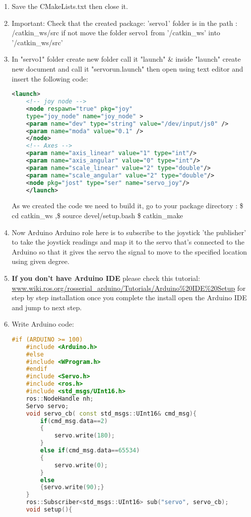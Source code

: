 \begin{enumerate}
 	\item Save the CMakeLists.txt then close it.
 	\item Important: Check that the created package: 'servo1' folder is in the path : /catkin\_ws/src
 	if not move the folder servo1 from '/catkin\_ws' into '/catkin\_ws/src'
 	\item In "servo1" folder create new folder call it "launch" \& inside "launch" create new document and call it "servorun.launch" then open using text editor and insert the following code:\\
 	\begin{lstlisting}[language=XML]
 	<launch>
 	<!-- joy node -->
 	<node respawn="true" pkg="joy"
 	type="joy_node" name="joy_node" >
 	<param name="dev" type="string" value="/dev/input/js0" />
 	<param name="moda" value="0.1" />
 	</node>
 	<!-- Axes -->
 	<param name="axis_linear" value="1" type="int"/>
 	<param name="axis_angular" value="0" type="int"/>
 	<param name="scale_linear" value="2" type="double"/>
 	<param name="scale_angular" value="2" type="double"/>
 	<node pkg="jost" type="ser" name="servo_joy"/>
 	</launch>
 	\end{lstlisting}
 	As we created the code we need to build it, go to your package directory : \$ cd catkin\_ws ,\$ source devel/setup.bash \$ catkin\_make
 	\item Now Arduino
 	Arduino role here is to subscribe to the joystick 'the publisher' to take the joystick readings and map it to the servo that's connected to the Arduino so that it gives the servo the signal to move to the specified location using given degree.
 	\item \textbf{If you don't have Arduino IDE} please check this tutorial: \url{www.wiki.ros.org/rosserial_arduino/Tutorials/Arduino%20IDE%20Setup}
 	for step by step installation once you complete the install open the Arduino IDE and jump to next step.
 	\item Write Arduino code:
 	\begin{lstlisting}[language=CPP]
 	#if (ARDUINO >= 100)
 	#include <Arduino.h>
 	#else
 	#include <WProgram.h>
 	#endif
 	#include <Servo.h>
 	#include <ros.h>
 	#include <std_msgs/UInt16.h>
 	ros::NodeHandle nh;
 	Servo servo;
 	void servo_cb( const std_msgs::UInt16& cmd_msg){
 		if(cmd_msg.data==2)
 		{
 			servo.write(180);
 		}
 		else if(cmd_msg.data==65534)
 		{
 			servo.write(0);
 		}
 		else
 		{servo.write(90);}
 	}
 	ros::Subscriber<std_msgs::UInt16> sub("servo", servo_cb);
 	void setup(){
 		

\end{lstlisting}
\end{enumerate}
